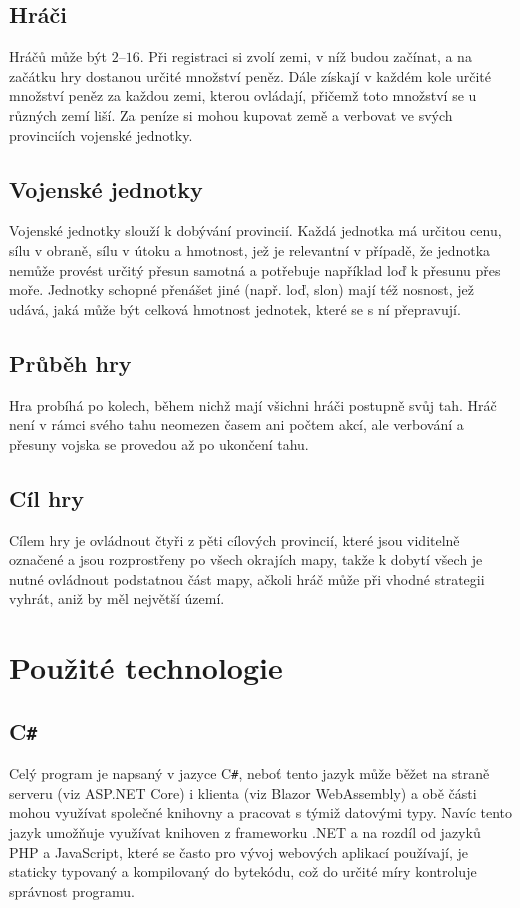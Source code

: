 \documentclass[a4paper,12pt]{article}
\def\CS{C\texttt{\#}}
\begin{document}
\subsection{Hráči}
Hráčů může být $2$--$16$. Při registraci si zvolí zemi, v níž budou začínat, a na začátku hry dostanou určité množství peněz. Dále získají v každém kole určité množství peněz za každou zemi, kterou ovládají, přičemž toto množství se u různých zemí liší. Za peníze si mohou kupovat země a verbovat ve svých provinciích vojenské jednotky.
\subsection{Vojenské jednotky}
Vojenské jednotky slouží k dobývání provincií. Každá jednotka má určitou cenu, sílu v obraně, sílu v útoku a hmotnost, jež je relevantní v případě, že jednotka nemůže provést určitý přesun samotná a potřebuje například loď k přesunu přes moře. Jednotky schopné přenášet jiné (např. loď, slon) mají též nosnost, jež udává, jaká může být celková hmotnost jednotek, které se s ní přepravují.
\subsection{Průběh hry}
Hra probíhá po kolech, během nichž mají všichni hráči postupně svůj tah. Hráč není v rámci svého tahu neomezen časem ani počtem akcí, ale verbování a přesuny vojska se provedou až po ukončení tahu.
\subsection{Cíl hry}
Cílem hry je ovládnout čtyři z pěti cílových provincií, které jsou viditelně označené a jsou rozprostřeny po všech okrajích mapy, takže k dobytí všech je nutné ovládnout podstatnou část mapy, ačkoli hráč může při vhodné strategii vyhrát, aniž by měl největší území.

\section{Použité technologie}
\subsection{\CS{}}
Celý program je napsaný v jazyce \CS{}, neboť tento jazyk může běžet na straně serveru (viz ASP.NET Core) i klienta (viz Blazor WebAssembly) a obě části mohou využívat společné knihovny a pracovat s týmiž datovými typy. Navíc tento jazyk umožňuje využívat knihoven z frameworku .NET a na rozdíl od jazyků PHP a JavaScript, které se často pro vývoj webových aplikací používají, je staticky typovaný a kompilovaný do bytekódu, což do určité míry kontroluje správnost programu.
\end{document}
